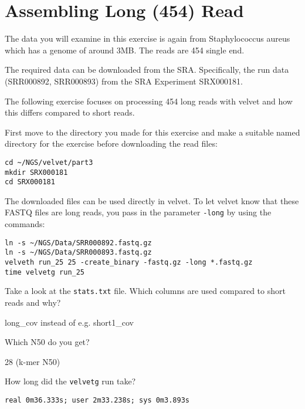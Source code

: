 \section{Assembling Long (454) Read}

\begin{note}
The data you will examine in this exercise is again from Staphylococcus aureus
which has a genome of around 3MB. The reads are 454 single end.

The required data can be downloaded from the SRA. Specifically, the run data
(SRR000892, SRR000893) from the SRA Experiment SRX000181.

\end{note}

\begin{information}
The following exercise focuses on processing 454 long reads with velvet and how
this differs compared to short reads.
\end{information}

\begin{steps}
First move to the directory you made for this exercise and make a suitable named
directory for the exercise before downloading the read files:
\begin{lstlisting}
cd ~/NGS/velvet/part3
mkdir SRX000181
cd SRX000181
\end{lstlisting}

The downloaded files can be used directly in velvet. To let velvet know that
these FASTQ files are long reads, you pass in the parameter \texttt{-long} by
using the commands:
\begin{lstlisting}
ln -s ~/NGS/Data/SRR000892.fastq.gz
ln -s ~/NGS/Data/SRR000893.fastq.gz
velveth run_25 25 -create_binary -fastq.gz -long *.fastq.gz
time velvetg run_25
\end{lstlisting}
\end{steps}

\begin{questions}
Take a look at the \texttt{stats.txt} file. Which columns are used compared to
short reads and why?
\begin{answer}
long\_cov instead of e.g. short1\_cov
\end{answer}

Which N50 do you get?
\begin{answer}
28 (k-mer N50)
\end{answer}

How long did the \texttt{velvetg} run take?
\begin{answer}
\texttt{real    0m36.333s; user    2m33.238s; sys     0m3.893s}
\end{answer}
\end{questions}

